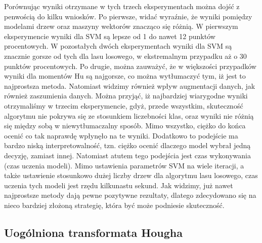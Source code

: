 \noindent Porównując wyniki otrzymane w tych trzech eksperymentach można dojść z penwością do kilku wniosków. Po pierwsze, widać wyraźnie, że wyniki pomiędzy modelami drzew oraz maszyny wektorów znacząco się różnią. W pierwszym eksperymencie wyniki dla SVM są lepsze od 1 do nawet 12 punktów procentowych. W pozostałych dwóch eksperymentach wyniki dla SVM są znacznie gorsze od tych dla lasu losowego, w ekstremalnym przypadku aż o 30 punktów procentowych. Po drugie, można zauważyć, że w większości przypadków wyniki dla momentów Hu są najgorsze, co można wytłumaczyć tym, iż jest to najprostsza metoda. Natomiast widzimy również wpływ augmentacji danych, jak również zaszumienia danych. Można przyjąć, iż najbardziej wiarygodne wyniki otrzymaliśmy w trzecim eksperymencie, gdyż, przede wszystkim, skuteczność algorytmu nie pokrywa się ze stosunkiem liczebności klas, oraz wyniki nie różnią się między sobą w niewytłumaczalny sposób. Mimo wszystko, ciężko do końca ocenić co tak naprawdę wpłynęło na te wyniki. Dodatkowo to podejście ma bardzo niską interpretowalność, tzn. ciężko ocenić dlaczego model wybrał jedną decyzję, zamiast innej. Natomiast atutem tego podejścia jest czas wykonywania (czas uczenia modeli). Mimo ustawienia parametrów SVM na wiele iteracji, a także ustawienie stosunkowo dużej liczby drzew dla algorytmu lasu losowego, czas uczenia tych modeli jest rzędu kilkunastu sekund. Jak widzimy, już nawet najprostsze metody dają pewne pozytywne rezultaty, dlatego zdecydowano się na nieco bardziej złożoną strategię, która być może podniesie skuteczność.

\subsection{Uogólniona transformata Hougha}
\label{hough}

